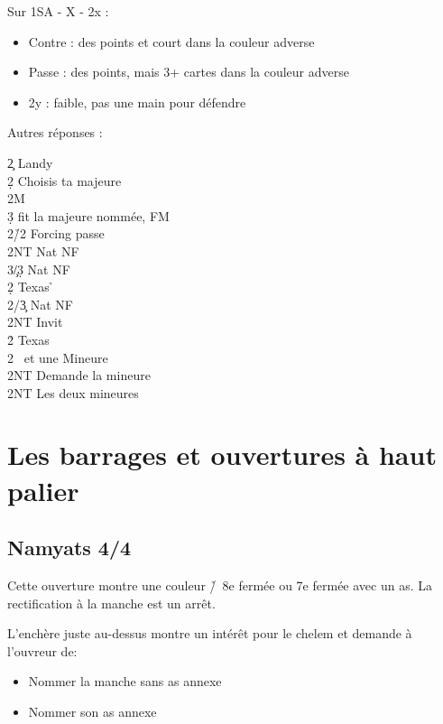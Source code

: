 \documentclass[a4paper]{article}
\begin{document}
Sur 1SA - X - 2x :

\begin{itemize}
\item Contre : des points et court dans la couleur adverse

\item Passe : des points, mais 3+ cartes dans la couleur adverse

\item 2y : faible, pas une main pour défendre

\end{itemize}

Autres réponses :

\begin{bidtable}
2\c \> Landy\+\\
2\d \> Choisis ta majeure\+\\
2M\+\\
3\d \> fit la majeure nommée, FM\-\-\\
2\h/2\s \> Forcing passe\\
2NT \> Nat NF\\
3\c/3\d \> Nat NF\-\\
2\d \> Texas \h \+\\
2\s/3\c \> Nat NF\\
2NT \> Invit\-\\
2\h \> Texas \s \\
2\s \> \s\ et une Mineure\+\\
2NT \> Demande la mineure\-\\
2NT \> Les deux mineures
\end{bidtable}

\section{Les barrages et ouvertures à haut palier}

\subsection{Namyats 4\pdfc/4\pdfd}

Cette ouverture montre une couleur \h /\s\ 8e fermée ou 7e fermée avec un as.
La rectification à la manche est un arrêt.

L'enchère juste au-dessus montre un intérêt pour le chelem et demande à l'ouvreur de:

\begin{itemize}
\item Nommer la manche sans as annexe

\item Nommer son as annexe

\end{itemize}
\end{document}
